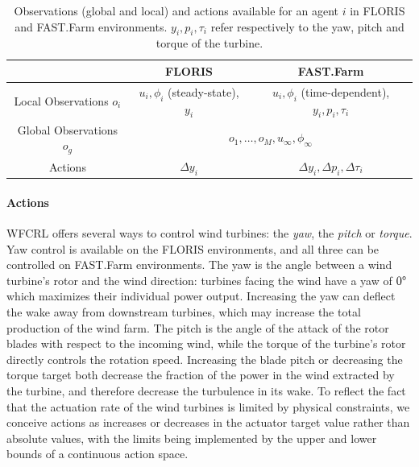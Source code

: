 \documentclass{article}
\newcommand{\jz}[1]{{\color{blue}#1}}
\newcommand{\md}[1]{{\color{red}#1}}
\begin{document}
%
%
\begin{table}
    \centering
    \begin{tabular}{c|c|c}
        & FLORIS & FAST.Farm  
        \\ \hline %
         Local Observations $o_i $&  $u_i, \phi_i$ (steady-state), $y_i$ & $u_i, \phi_i$ (time-dependent), $y_i, p_i, \tau_i$ \\
         Global Observations $o_g$ & \multicolumn{2}{c}{$o_1, \dots, o_M, u_{\infty}, \phi_{\infty}$}\\
         Actions & 
         $\Delta y_i$ & $\Delta y_i, \Delta p_i, \Delta \tau_i$ \\
         \hline
    \end{tabular}
    \caption{Observations (global and local) and actions available for an agent $i$ in FLORIS and FAST.Farm environments. $y_i, p_i, \tau_i$ refer respectively to the yaw, pitch and torque of the turbine.}
    \label{tab:summary_obs_actions}
    \vspace{-2em}
\end{table}
%
\paragraph{Actions}
WFCRL offers several ways to control wind turbines: the \textit{yaw}, the \textit{pitch} or \textit{torque}. Yaw control is available on the FLORIS environments, and all three can be controlled on FAST.Farm environments. The yaw is the angle between a wind turbine's rotor and the wind direction: turbines facing the wind have a yaw of $0\degree$ which maximizes their individual power output. Increasing the yaw can deflect the wake away from downstream turbines, which may increase the total production of the wind farm. 
The pitch is the angle of the attack of the rotor blades with respect to the incoming wind, while the torque of the turbine's rotor directly controls the rotation speed. Increasing the blade pitch or decreasing the torque target both decrease the fraction of the power in the wind extracted by the turbine, and therefore decrease the turbulence in its wake. 
To reflect the fact that the actuation rate of the wind turbines is limited by physical constraints, we conceive actions as increases or decreases in the actuator target value rather than absolute values, with the limits being implemented by the upper and lower bounds of a continuous action space. 
\end{document}
